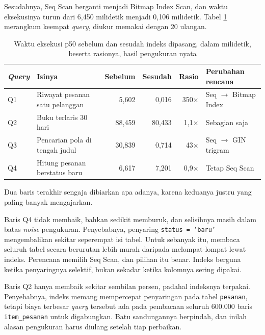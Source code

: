Sesudahnya, Seq Scan berganti menjadi Bitmap Index Scan, dan waktu eksekusinya
turun dari 6,450 milidetik menjadi 0,106 milidetik. Tabel \ref{tab:sebelum-sesudah}
merangkum keempat \textit{query}, diukur memakai
 dengan 20 ulangan.

\begin{table}[!htb]
  \centering
  \caption{Waktu eksekusi p50 sebelum dan sesudah indeks dipasang, dalam
           milidetik, beserta rasionya, hasil pengukuran nyata}
  \label{tab:sebelum-sesudah}
  \begin{tabularx}{\textwidth}{lXrrrl}
    \hline
    \textbf{\textit{Query}} & \textbf{Isinya} & \textbf{Sebelum} & \textbf{Sesudah} & \textbf{Rasio} & \textbf{Perubahan rencana} \\
    \hline
    Q1 & Riwayat pesanan satu pelanggan & 5,602 & 0,016 & 350$\times$ & Seq $\rightarrow$ Bitmap Index \\
    \hline
    Q2 & Buku terlaris 30 hari & 88,459 & 80,433 & 1,1$\times$ & Sebagian saja \\
    \hline
    Q3 & Pencarian pola di tengah judul & 30,839 & 0,714 & 43$\times$ & Seq $\rightarrow$ GIN trigram \\
    \hline
    Q4 & Hitung pesanan berstatus baru & 6,617 & 7,201 & 0,9$\times$ & Tetap Seq Scan \\
    \hline
  \end{tabularx}
\end{table}

Dua baris terakhir sengaja dibiarkan apa adanya, karena keduanya justru yang
paling banyak mengajarkan.

Baris Q4 tidak membaik, bahkan sedikit memburuk, dan selisihnya masih dalam
batas \textit{noise} pengukuran. Penyebabnya, penyaring \texttt{status = 'baru'}
mengembalikan sekitar seperempat isi tabel. Untuk sebanyak itu, membaca seluruh
tabel secara berurutan lebih murah daripada melompat-lompat lewat indeks.
Perencana memilih Seq Scan, dan pilihan itu benar. Indeks berguna ketika
penyaringnya selektif, bukan sekadar ketika kolomnya sering dipakai.

Baris Q2 hanya membaik sekitar sembilan persen, padahal indeksnya terpakai.
Penyebabnya, indeks memang mempercepat penyaringan pada tabel \texttt{pesanan},
tetapi biaya terbesar \textit{query} tersebut ada pada pembacaan seluruh 600.000 baris
\texttt{item\_pesanan} untuk digabungkan. Batu sandungannya berpindah, dan
inilah alasan pengukuran harus diulang setelah tiap perbaikan.

